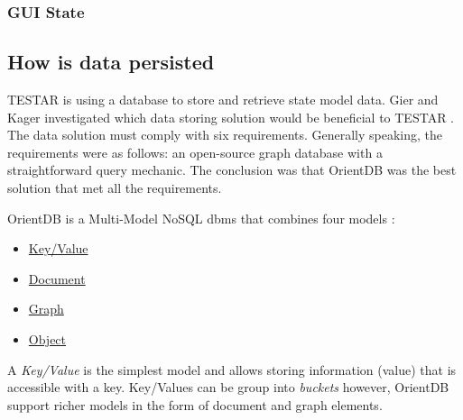

\subsubsection{GUI State} \label{gui-state}

\subsection{How is data persisted}

TESTAR is using a database to store and retrieve state model data. Gier and Kager investigated which data storing solution would be beneficial to TESTAR \cite{GierKager}. The data solution must comply with six requirements. Generally speaking, the requirements were as follows: an open-source graph database with a straightforward query mechanic. The conclusion was that OrientDB was the best solution that met all the requirements.

OrientDB is a Multi-Model NoSQL \acrfull{dbms} that combines four models \cite{orientDbModeling}:

\begin{itemize}
    \item \hyperlink{db:key-value}{Key/Value}
    \item \hyperlink{db:document}{Document}
    \item \hyperlink{db:graph}{Graph}
    \item \hyperlink{db:object}{Object}
\end{itemize}

A \hypertarget{db:key-value}{\emph{Key/Value}} is the simplest model and allows storing information (value) that is accessible with a key. Key/Values can be group into \textit{buckets} however, OrientDB support richer models in the form of document and graph elements.

